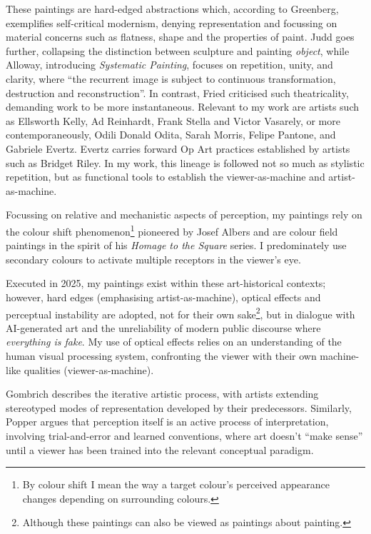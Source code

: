 \documentclass[12pt]{article}
\begin{document}
These paintings are hard-edged abstractions which, according to
Greenberg, exemplifies self-critical modernism, denying representation
and focussing on material concerns such as flatness, shape and the
properties of paint.\autocite[p.~85--93]{Greenberg1961} Judd goes further,
collapsing the distinction between sculpture and painting
\emph{object}\autocite{Judd1965}, while Alloway, introducing
\emph{Systematic Painting}, focuses on repetition, unity, and clarity,
where ``the recurrent image is subject to continuous transformation,
destruction and reconstruction''.\autocite[pp.~18--19]{Alloway1975} In
contrast, Fried criticised such theatricality, demanding work to be
more instantaneous.\autocite[pp.~12--23]{Fried1968} Relevant to my work are
artists such as Ellsworth Kelly, Ad Reinhardt, Frank Stella and Victor
Vasarely, or more contemporaneously, Odili Donald Odita, Sarah Morris,
Felipe Pantone, and Gabriele Evertz. Evertz carries forward Op Art
practices\autocite{Follin2004EmbodiedVisions,Seitz1965ResponsiveEye}
established by artists such as Bridget
Riley.\autocite{Riley2019EyesMind,Riley2019DialoguesOnArt} In my work,
this lineage is followed not so much as stylistic repetition, but as
functional tools to establish the viewer-as-machine and artist-as-machine.

Focussing on relative and mechanistic aspects of perception, my
paintings rely on the colour shift phenomenon\footnote{By colour shift
  I mean the way a target colour’s perceived appearance changes
  depending on surrounding colours.} pioneered by Josef
Albers\autocite{albers} and are colour field paintings in the spirit
of his \emph{Homage to the Square} series. I predominately use
secondary colours to activate multiple receptors in the viewer's
eye.\autocite{HurvichJameson1957,Land1977,SchnapfKraftBaylor1987}

Executed in 2025, my paintings exist within these art-historical
contexts; however, hard edges (emphasising artist-as-machine),
optical effects and perceptual instability are adopted, not for their
own sake\footnote{Although these paintings can also be viewed as
  paintings about painting.}, but in dialogue with AI-generated art
and the unreliability of modern public discourse where \emph{everything is
fake}.\autocite[p.~105]{mcintyre2018posttruth} My use of optical effects relies on an understanding of the human
visual processing system, confronting the viewer with their own
machine-like qualities (viewer-as-machine).

Gombrich describes the iterative artistic process, with artists
extending stereotyped modes of representation developed by their
predecessors.\autocite[Chapters II, V]{gombrich1960art} Similarly, Popper
argues that perception itself is an active process of interpretation,
involving trial-and-error and learned conventions, where art doesn't
``make sense'' until a viewer has been trained into the relevant
conceptual paradigm.\autocite[Chapter 2]{popper1972objective}
\end{document}
